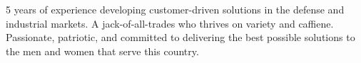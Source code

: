 

\begin{cvparagraph}

5 years
of experience developing customer-driven solutions in the defense and
industrial markets. A jack-of-all-trades who thrives on variety and caffiene.
Passionate, patriotic, and committed to delivering the best possible
solutions to the men and women that serve this country.
\end{cvparagraph}
